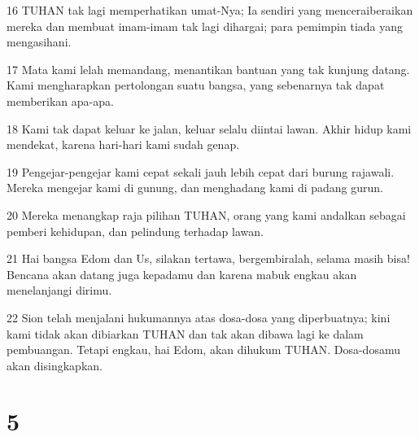 \par 16 TUHAN tak lagi memperhatikan umat-Nya; Ia sendiri yang menceraiberaikan mereka dan membuat imam-imam tak lagi dihargai; para pemimpin tiada yang mengasihani.
\par 17 Mata kami lelah memandang, menantikan bantuan yang tak kunjung datang. Kami mengharapkan pertolongan suatu bangsa, yang sebenarnya tak dapat memberikan apa-apa.
\par 18 Kami tak dapat keluar ke jalan, keluar selalu diintai lawan. Akhir hidup kami mendekat, karena hari-hari kami sudah genap.
\par 19 Pengejar-pengejar kami cepat sekali jauh lebih cepat dari burung rajawali. Mereka mengejar kami di gunung, dan menghadang kami di padang gurun.
\par 20 Mereka menangkap raja pilihan TUHAN, orang yang kami andalkan sebagai pemberi kehidupan, dan pelindung terhadap lawan.
\par 21 Hai bangsa Edom dan Us, silakan tertawa, bergembiralah, selama masih bisa! Bencana akan datang juga kepadamu dan karena mabuk engkau akan menelanjangi dirimu.
\par 22 Sion telah menjalani hukumannya atas dosa-dosa yang diperbuatnya; kini kami tidak akan dibiarkan TUHAN dan tak akan dibawa lagi ke dalam pembuangan. Tetapi engkau, hai Edom, akan dihukum TUHAN. Dosa-dosamu akan disingkapkan.

\chapter{5}

